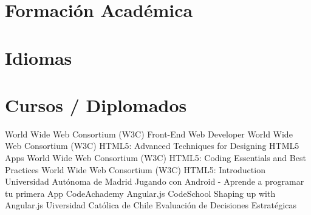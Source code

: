\documentclass[]{cvStyle1}
\begin{document}
    \section*{Formaci\'on Acad\'emica}
        
    \section*{Idiomas}
        
    
        
        
        
        
        
        
        
        
    \section*{Cursos / Diplomados}
        \skill
            {World Wide Web Consortium (W3C)}
            {Front-End Web Developer}
        \skill
            {World Wide Web Consortium (W3C)}
            {HTML5: Advanced Techniques for Designing HTML5 Apps}
        \skill
            {World Wide Web Consortium (W3C)}
            {HTML5: Coding Essentials and Best Practices}
        \skill
            {World Wide Web Consortium (W3C)}
            {HTML5: Introduction}
        \skill
            {Universidad Aut\'onoma de Madrid}
            {Jugando con Android - Aprende a programar tu primera App}
        \skill
            {CodeAchademy}
            {Angular.js}
        \skill
            {CodeSchool}
            {Shaping up with Angular.js}
        \skill
            {Uiversidad Cat\'olica de Chile}
            {Evaluaci\'on de Decisiones Estrat\'egicas}
\end{document}
